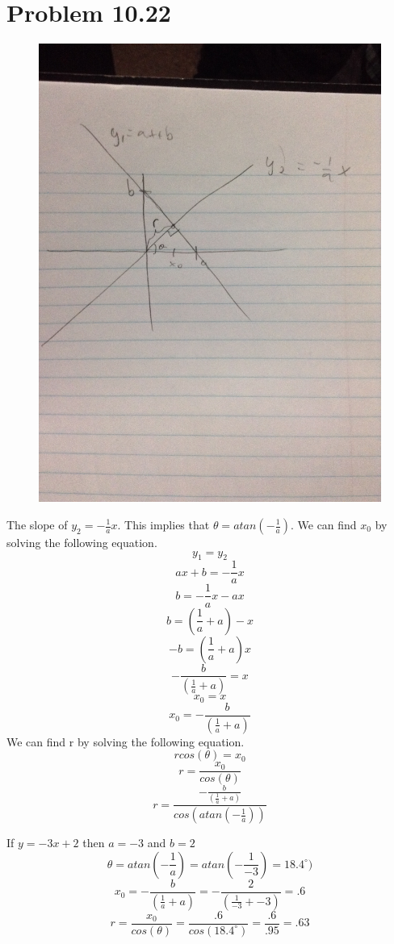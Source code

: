 \documentclass{article}
\begin{document}
	\section{Problem 10.22}
	\begin{figure}[H]
		\includegraphics[width=\linewidth]{fig3.JPG}
	\end{figure}
	
	The slope of \(y_2 = -\frac{1}{a}x\). This implies that \(\theta = atan(-\frac{1}{a})\).
	We can find \(x_0\) by solving the following equation.
	\[y_1 = y_2\]
	\[ax + b = -\frac{1}{a}x\]
	\[b = -\frac{1}{a}x - ax\]
	\[b = (\frac{1}{a} + a)-x\]
	\[-b = (\frac{1}{a} + a)x\]
	\[-\frac{b}{(\frac{1}{a} + a)} = x\]
	\[x_0 = x\]
	\[x_0 = -\frac{b}{(\frac{1}{a} + a)} \]
	We can find r by solving the following equation.
	\[rcos(\theta) = x_0\]
	\[r = \frac{x_0}{cos(\theta)}\]
	\[r = \frac{-\frac{b}{(\frac{1}{a} + a)} }{cos(atan(-\frac{1}{a}))}\]
	
	
	If \(y = -3x + 2\) then \(a = -3\) and \(b = 2\) 
	\[\theta = atan(-\frac{1}{a}) = atan(-\frac{1}{-3}) = 18.4^\circ)\]
	\[x_0 = -\frac{b}{(\frac{1}{a} + a)} = -\frac{2}{(\frac{1}{-3} + -3)} = .6\]
	\[r = \frac{x_0}{cos(\theta)} = \frac{.6}{cos(18.4^\circ)} = \frac{.6}{.95} = .63\]
	
\end{document}
